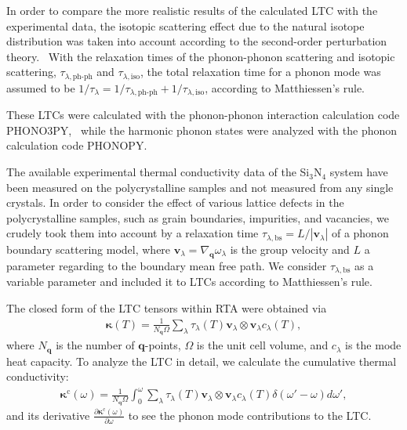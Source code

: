 \documentclass[twocolumn,amsmath,amssymb,a4paper,prb,superscriptaddress,floatfix]{revtex4-1}
\begin{document}
In order to compare the more realistic results of the calculated LTC with the
experimental data, the isotopic scattering effect due to the natural isotope
distribution was taken into account according to the second-order perturbation
theory.~\cite{tamura} With the relaxation times of the phonon-phonon scattering
and isotopic scattering, $\tau_{\lambda,\text{ph-ph}}$ and
$\tau_{\lambda,\text{iso}}$, the total relaxation time for a phonon mode was
assumed to be $1/\tau_{\lambda} = 1/\tau_{\lambda,\text{ph-ph}} +
1/\tau_{\lambda,\text{iso}}$, according to Matthiessen's rule.

These LTCs were calculated with the phonon-phonon interaction calculation code
PHONO3PY,~\cite{phono3py} while the harmonic phonon states were analyzed with
the phonon calculation code PHONOPY.~\cite{phonopy} 

The available experimental thermal conductivity data of the Si$_3$N$_4$ system
have been measured on the polycrystalline samples and not measured from any
single crystals. In order to consider the effect of various lattice defects in
the polycrystalline samples, such as grain boundaries, impurities, and
vacancies, we crudely took them into account by a relaxation time
$\tau_{\lambda,\text{bs}}=L/|\mathbf{v}_\lambda|$ of a phonon boundary
scattering model, where $\mathbf{v}_\lambda =
\nabla_{\mathbf{q}}\omega_\lambda$ is the group velocity and $L$ a
parameter regarding to the boundary mean free path. We consider
$\tau_{\lambda,\text{bs}}$ as a variable parameter and included it to
LTCs according to Matthiessen's rule.

The closed form of the LTC tensors within RTA were obtained via
\begin{align}
 \label{eq:kappa}
 \boldsymbol{\kappa}(T) = \frac{1}{N_\mathbf{q}\Omega} \sum_\lambda
 \tau_\lambda(T) \mathbf{v}_\lambda \otimes \mathbf{v}_\lambda c_\lambda(T),
\end{align}
where $N_\mathbf{q}$ is the number of
$\mathbf{q}$-points, $\Omega$ is the unit cell volume, and $c_\lambda$
is the mode heat capacity. To analyze the LTC in detail, we calculate
the cumulative thermal conductivity:
\begin{align}
 \label{eq:cum-kappa}
 \boldsymbol{\kappa}^\text{c}(\omega) = \frac{1}{N_\mathbf{q}\Omega}
 \int_0^\omega \sum_\lambda
 \tau_\lambda(T) \mathbf{v}_\lambda \otimes \mathbf{v}_\lambda
 c_\lambda(T) \delta(\omega'-\omega)d\omega',
\end{align}
and its derivative $\frac{\partial
\boldsymbol{\kappa}^\text{c}(\omega)}{\partial \omega}$ to see the phonon mode
contributions to the LTC.
\end{document}
